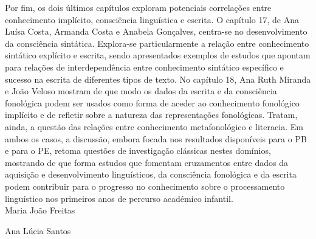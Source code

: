 \begin{refsection}
Por fim, os dois últimos capítulos exploram potenciais correlações entre conhecimento implícito, consciência linguística e escrita. O capítulo 17, de Ana Luísa Costa, Armanda Costa e Anabela Gonçalves, centra-se no desenvolvimento da consciência sintática. Explora-se particularmente a relação entre conhecimento sintático explícito e escrita, sendo apresentados exemplos de estudos que apontam para relações de interdependência entre conhecimento sintático específico e sucesso na escrita de diferentes tipos de texto. No capítulo 18, Ana Ruth Miranda e João Veloso mostram de que modo os dados da escrita e da consciência fonológica podem ser usados como forma de aceder ao conhecimento fonológico implícito e de refletir sobre a natureza das representações fonológicas. Tratam, ainda, a questão das relações entre conhecimento metafonológico e literacia. Em ambos os casos, a discussão, embora focada nos resultados disponíveis para o PB e para o PE, retoma questões de investigação clássicas nestes domínios, mostrando de que forma estudos que fomentam cruzamentos entre dados da aquisição e desenvolvimento linguísticos, da consciência fonológica e da escrita podem contribuir para o progresso no conhecimento sobre o processamento linguístico nos primeiros anos de percurso académico infantil.\\

\hfill Maria João Freitas

\hfill Ana Lúcia Santos





\printbibliography[heading=subbibliography]
\end{refsection}